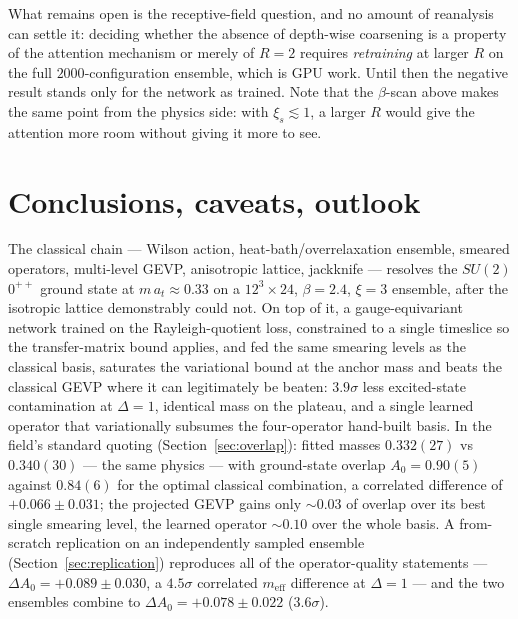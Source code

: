 \documentclass[11pt,a4paper]{article}
\newcommand{\meff}{m_{\mathrm{eff}}}
\newcommand{\at}{a_t}
\begin{document}
What remains open is the receptive-field question, and no amount of reanalysis
can settle it: deciding whether the absence of depth-wise coarsening is a
property of the attention mechanism or merely of $R=2$ requires
\emph{retraining} at larger $R$ on the full $2000$-configuration ensemble,
which is GPU work. Until then the negative result stands only for the network
as trained. Note that the $\beta$-scan above makes the same point from the
physics side: with $\xi_s\lesssim1$, a larger $R$ would give the attention
more room without giving it more to see.

\section{Conclusions, caveats, outlook}

The classical chain --- Wilson action, heat-bath/overrelaxation ensemble,
smeared operators, multi-level GEVP, anisotropic lattice, jackknife ---
resolves the $SU(2)$ $0^{++}$ ground state at $m\,\at\approx0.33$ on a
$12^3\times24$, $\beta=2.4$, $\xi=3$ ensemble, after the isotropic lattice
demonstrably could not. On top of it, a gauge-equivariant network trained on
the Rayleigh-quotient loss, constrained to a single timeslice so the
transfer-matrix bound applies, and fed the same smearing levels as the
classical basis, saturates the variational bound at the anchor mass and beats
the classical GEVP where it can legitimately be beaten: $3.9\sigma$ less
excited-state contamination at $\Delta=1$, identical mass on the plateau, and
a single learned operator that variationally subsumes the four-operator
hand-built basis. In the field's standard quoting (Section~\ref{sec:overlap}):
fitted masses $0.332(27)$ vs $0.340(30)$ --- the same physics --- with
ground-state overlap $A_0=0.90(5)$ against $0.84(6)$ for the optimal
classical combination, a correlated difference of $+0.066\pm0.031$; the
projected GEVP gains only $\sim0.03$ of overlap over its best single smearing
level, the learned operator $\sim0.10$ over the whole basis. A from-scratch
replication on an independently sampled ensemble
(Section~\ref{sec:replication}) reproduces all of the operator-quality
statements --- $\Delta A_0=+0.089\pm0.030$, a $4.5\sigma$ correlated $\meff$
difference at $\Delta=1$ --- and the two ensembles combine to
$\Delta A_0=+0.078\pm0.022$ ($3.6\sigma$).
\end{document}
